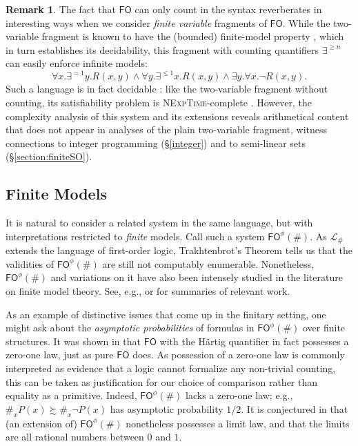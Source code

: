 \documentclass[12pt,oneside,reqno]{amsart}
\theoremstyle{definition}
\newtheorem{remark}{Remark}
\begin{document}
\begin{remark} \label{remark:finvar} The fact that $\mathsf{FO}$ can only count in the syntax reverberates in interesting ways when we consider \emph{finite variable} fragments of $\mathsf{FO}$.  While the two-variable fragment is known to have the (bounded) finite-model property \citep{Mortimer}, which in turn establishes its  decidability, this fragment with counting quantifiers $\exists ^{\geq n}$ can easily enforce infinite models: 
$$ \forall x. \exists^{=1}y. R(x,y) \wedge \forall y .\exists^{\leq 1} x. R(x,y) \wedge \exists y . \forall x. \neg R(x,y) . $$
Such a language is in fact decidable \citep{GradelOtto}: like the two-variable fragment without counting, its satisfiability problem is \textsc{NExpTime}-complete \citep{Pratt-Hartmann}. However, the complexity analysis of this system and its extensions \citep{Kieronski}  reveals arithmetical content that does not appear in analyses of the plain two-variable fragment, witness connections to integer programming (\S\ref{integer}) and to semi-linear sets (\S\ref{section:finiteSO}). \end{remark}

\subsection{Finite Models} It is natural to consider a related system in the same language, but with interpretations restricted to \emph{finite} models. Call such a system $\mathsf{FO}^\phi(\#)$. As $\mathcal{L}_\#$ extends the language of first-order logic, Trakhtenbrot's Theorem tells us that the validities of $\mathsf{FO}^\phi(\#)$ are still not computably enumerable. Nonetheless, $\mathsf{FO}^\phi(\#)$ and variations on it have also been intensely studied in the literature on finite model theory.  See, e.g., \cite{Otto} or \cite{Schweikardt} for summaries of relevant work.

As an example of distinctive issues that come up in the finitary setting, one might ask about the \emph{asymptotic probabilities} of formulas in $\mathsf{FO}^\phi(\#)$ over finite structures. It was shown in \cite{Grumbach}
that $\mathsf{FO}$ with the H\"{a}rtig quantifier in fact possesses a zero-one law, just as pure $\mathsf{FO}$ does. As possession of a zero-one law is commonly interpreted as evidence that a logic cannot formalize any non-trivial counting, this can be taken as justification for our choice of comparison rather than  equality as a primitive. Indeed, $\mathsf{FO}^\phi(\#)$ lacks a zero-one law; e.g., $\#_x P(x) \succsim \#_x \neg P(x)$ has asymptotic probability $1/2$. It is conjectured in \cite{Grumbach} that (an extension of) $\mathsf{FO}^\phi(\#)$ nonetheless possesses a limit law, and that the limits are all rational numbers between $0$ and $1$. 
\end{document}
